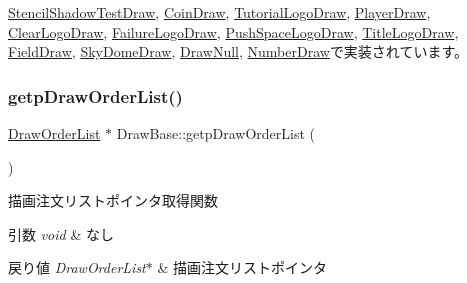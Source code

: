 \mbox{\hyperlink{class_stencil_shadow_test_draw_a58f3699fa7ced20625edca807698aa85}{Stencil\+Shadow\+Test\+Draw}}, \mbox{\hyperlink{class_coin_draw_af99db1c0db2ed6b3ba429f23cd44279b}{Coin\+Draw}}, \mbox{\hyperlink{class_tutorial_logo_draw_abf06755b745dc62341a817a58d377659}{Tutorial\+Logo\+Draw}}, \mbox{\hyperlink{class_player_draw_ae69b46285241f390fbf62f6af2b5340d}{Player\+Draw}}, \mbox{\hyperlink{class_clear_logo_draw_ae67f9779fb2f9aa05d55c2167a36ddb0}{Clear\+Logo\+Draw}}, \mbox{\hyperlink{class_failure_logo_draw_a29a9642997edb92eeec83e8bd6b1ddee}{Failure\+Logo\+Draw}}, \mbox{\hyperlink{class_push_space_logo_draw_abfba58752543d8b2ccfe1e4003032dd3}{Push\+Space\+Logo\+Draw}}, \mbox{\hyperlink{class_title_logo_draw_a15ca49711182673a20439200dd8bc119}{Title\+Logo\+Draw}}, \mbox{\hyperlink{class_field_draw_a77cef7390fbe8fc68c0b325f4fcc839f}{Field\+Draw}}, \mbox{\hyperlink{class_sky_dome_draw_a99ec8e0a5aea708b66cf07c79a6449d1}{Sky\+Dome\+Draw}}, \mbox{\hyperlink{class_draw_null_a87d21f70b6fed637a6e23029f29818c1}{Draw\+Null}}, \mbox{\hyperlink{class_number_draw_a77d155c00ac4637154e62904556de05a}{Number\+Draw}}で実装されています。

\mbox{\label{class_draw_base_af5fe522d4bbce381e6fe8e5601b69e9f}} 
\subsubsection{\texorpdfstring{getp\+Draw\+Order\+List()}{getpDrawOrderList()}}
{\footnotesize\ttfamily \mbox{\hyperlink{class_draw_order_list}{Draw\+Order\+List}} $\ast$ Draw\+Base\+::getp\+Draw\+Order\+List (\begin{DoxyParamCaption}{ }\end{DoxyParamCaption})}



描画注文リストポインタ取得関数 


\begin{DoxyParams}{引数}
{\em void} & なし \\
\hline
\end{DoxyParams}

\begin{DoxyRetVals}{戻り値}
{\em Draw\+Order\+List$\ast$} & 描画注文リストポインタ \\
\hline
\end{DoxyRetVals}


